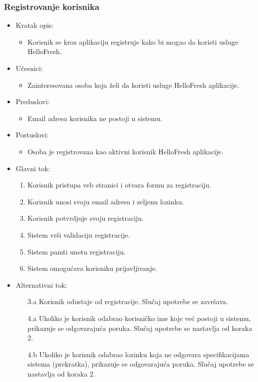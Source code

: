 \subsubsection{Registrovanje korisnika}

\begin{itemize}
    \item Kratak opis:
        \begin{itemize}
            \item Korisnik se kroz aplikaciju registruje kako bi mogao da koristi usluge HelloFresh.
        \end{itemize}
    \item Učesnici:
        \begin{itemize}
            \item Zainteresovana osoba koja želi da koristi usluge HelloFresh aplikacije.
        \end{itemize}
    \item Preduslovi:
        \begin{itemize}
            \item Email adresa korisnika ne postoji u sistemu.
        \end{itemize}
    \item Postuslovi:
        \begin{itemize}
            \item Osoba je registrovana kao aktivni korisnik HelloFresh aplikacije.
        \end{itemize}
    \item Glavni tok:
        \begin{enumerate}
            \item Korisnik pristupa veb stranici i otvara formu za registraciju.
            \item Korisnik unosi svoju email adresu i zeljenu lozinku.
            \item Korisnik potvrdjuje svoju registraciju.
            \item Sistem vrši validaciju registracije.
            \item Sistem pamti unetu registraciju.
            \item Sistem omogućava korisniku prijavljivanje.
        \end{enumerate}
    \item Alternativni tok:
        \begin{itemize}
            \item[3.a] Korisnik odustaje od registracije. Slučaj upotrebe se završava.
            \item[4.a] Ukoliko je korisnik odabrao korisničko ime koje već postoji u sistemu, prikazuje se odgovarajuća poruka. Slučaj upotrebe se nastavlja od koraka 2.
            \item[4.b] Ukoliko je korisnik odabrao lozinku koja ne odgovara specifikacijama sistema (prekratka), prikazuje se odgovarajuća poruka. Slučaj upotrebe se nastavlja od koraka 2.
        \end{itemize}
\end{itemize}
